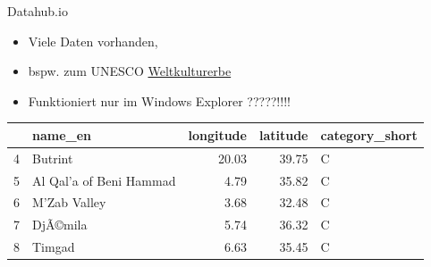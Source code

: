 \documentclass[ignorenonframetext,]{beamer}
\providecommand{\tightlist}{%
  \setlength{\itemsep}{0pt}\setlength{\parskip}{0pt}}
\begin{document}
\begin{frame}{Datahub.io}
\protect\hypertarget{datahub.io}{}

\begin{itemize}
\tightlist
\item
  Viele Daten vorhanden,
\item
  bspw. zum UNESCO
  \href{http://datahub.io/dataset/unesco-world-heritage-sites/resource/d4116195-44d8-4bc1-9f91-9b570870dc19}{Weltkulturerbe}
\item
  Funktioniert nur im Windows Explorer ?????!!!!
\end{itemize}

\begin{longtable}[]{@{}llrrl@{}}
\toprule
& name\_en & longitude & latitude & category\_short\tabularnewline
\midrule
\endhead
4 & Butrint & 20.03 & 39.75 & C\tabularnewline
5 & Al Qal'a of Beni Hammad & 4.79 & 35.82 & C\tabularnewline
6 & M'Zab Valley & 3.68 & 32.48 & C\tabularnewline
7 & DjÃ©mila & 5.74 & 36.32 & C\tabularnewline
8 & Timgad & 6.63 & 35.45 & C\tabularnewline
\bottomrule
\end{longtable}

\end{frame}
\end{document}
